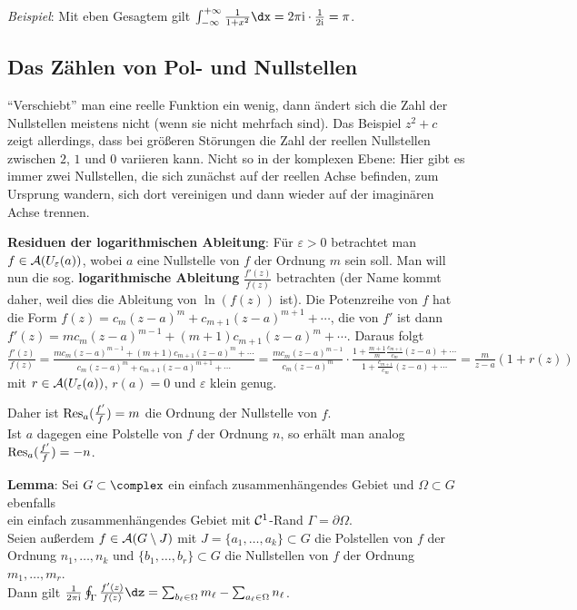 \emph{Beispiel}:
Mit eben Gesagtem gilt $\int_{-\infty}^{+\infty} \frac{1}{1 + x^2} \dx =
2\pi\i \cdot \frac{1}{2\i} = \pi$.

\pagebreak

\subsection{%
    Das Zählen von Pol- und Nullstellen%
}

"`Verschiebt"' man eine reelle Funktion ein wenig, dann ändert sich die
Zahl der Nullstellen meistens nicht (wenn sie nicht mehrfach sind).
Das Beispiel $z^2 + c$ zeigt allerdings, dass bei größeren Störungen
die Zahl der reellen Nullstellen zwischen $2$, $1$ und $0$ variieren kann.
Nicht so in der komplexen Ebene:
Hier gibt es immer zwei Nullstellen, die sich zunächst auf der reellen Achse
befinden, zum Ursprung wandern, sich dort vereinigen und dann wieder auf
der imaginären Achse trennen.

\linie

\textbf{Residuen der logarithmischen Ableitung}:
Für $\varepsilon > 0$ betrachtet man $f \in \mathcal{A}(U_\varepsilon(a))$, wobei
$a$ eine Nullstelle von $f$ der Ordnung $m$ sein soll.
Man will nun die sog. \textbf{logarithmische Ableitung} $\frac{f'(z)}{f(z)}$
betrachten (der Name kommt daher, weil dies die Ableitung von $\ln(f(z))$ ist).
Die Potenzreihe von $f$ hat die Form
$f(z) = c_m (z - a)^m + c_{m+1} (z - a)^{m+1} + \dotsb$,
die von $f'$ ist dann
$f'(z) = m c_m (z - a)^{m-1} + (m + 1) c_{m+1} (z - a)^m + \dotsb$.
Daraus folgt\\
$\frac{f'(z)}{f(z)} =
\frac{m c_m (z - a)^{m-1} + (m + 1) c_{m+1} (z - a)^m + \dotsb}
{c_m (z - a)^m + c_{m+1} (z - a)^{m+1} + \dotsb} =
\frac{m c_m (z - a)^{m-1}}{c_m (z - a)^m} \cdot
\frac{1 + \frac{m + 1}{m} \frac{c_{m+1}}{c_m} (z - a) + \dotsb}
{1 + \frac{c_{m+1}}{c_m} (z - a) + \dotsb} =
\frac{m}{z - a} (1 + r(z))$ mit $r \in \mathcal{A}(U_\varepsilon(a))$, $r(a) = 0$ und
$\varepsilon$ klein genug.

Daher ist $\operatorname{Res}_a(\frac{f'}{f}) = m$ die Ordnung der Nullstelle von $f$.\\
Ist $a$ dagegen eine Polstelle von $f$ der Ordnung $n$, so erhält man analog
$\operatorname{Res}_a(\frac{f'}{f}) = -n$.

\linie

\textbf{Lemma}:
Sei $G \subset \complex$ ein einfach zusammenhängendes Gebiet und
$\Omega \subset G$ ebenfalls\\
ein einfach zusammenhängendes Gebiet mit
$\mathcal{C}^1$-Rand $\Gamma = \partial \Omega$.\\
Seien außerdem $f \in \mathcal{A}(G \setminus J)$ mit
$J = \{a_1, \dotsc, a_k\} \subset G$ die
Polstellen von $f$ der Ordnung $n_1, \dotsc, n_k$ und
$\{b_1, \dotsc, b_r\} \subset G$ die Nullstellen von $f$
der Ordnung $m_1, \dotsc, m_r$.\\
Dann gilt $\frac{1}{2\pi\i} \oint_\Gamma \frac{f'(z)}{f(z)} \dz =
\sum_{b_\ell \in \Omega} m_\ell - \sum_{a_\ell \in \Omega} n_\ell$.

